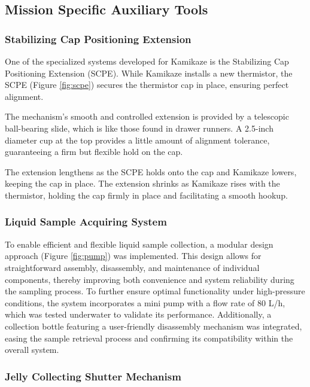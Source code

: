 \subsection{Mission Specific Auxiliary Tools}

\subsubsection{Stabilizing Cap Positioning Extension}

One of the specialized systems developed for Kamikaze is the Stabilizing Cap Positioning Extension (SCPE). While Kamikaze installs a new thermistor, the SCPE (Figure \ref{fig:scpe}) secures the thermistor cap in place, ensuring perfect alignment.

The mechanism's smooth and controlled extension is provided by a telescopic ball-bearing slide, which is like those found in drawer runners. A 2.5-inch diameter cup at the top provides a little amount of alignment tolerance, guaranteeing a firm but flexible hold on the cap.

The extension lengthens as the SCPE holds onto the cap and Kamikaze lowers, keeping the cap in place. The extension shrinks as Kamikaze rises with the thermistor, holding the cap firmly in place and facilitating a smooth hookup.

\subsubsection{Liquid Sample Acquiring System}

To enable efficient and flexible liquid sample collection, a modular design approach (Figure \ref{fig:pump}) was implemented. This design allows for straightforward assembly, disassembly, and maintenance of individual components, thereby improving both convenience and system reliability during the sampling process. To further ensure optimal functionality under high-pressure conditions, the system incorporates a mini pump with a flow rate of 80 L/h, which was tested underwater to validate its performance. Additionally, a collection bottle featuring a user-friendly disassembly mechanism was integrated, easing the sample retrieval process and confirming its compatibility within the overall system.

\subsubsection{Jelly Collecting Shutter Mechanism}

